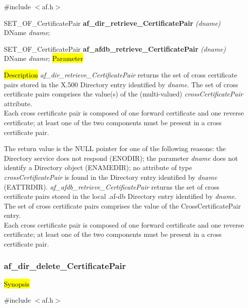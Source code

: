 \#include $<$af.h$>$ 

SET\_OF\_CertificatePair {\bf *af\_dir\_retrieve\_CertificatePair} {\em (dname)} \\
DName {\em *dname};

SET\_OF\_CertificatePair {\bf *af\_afdb\_retrieve\_CertificatePair} {\em (dname)} \\
DName {\em *dname};
\hl{Parameter}

\hl{Description}
{\em af\_dir\_retrieve\_CertificatePair} returns the set of cross certificate pairs 
stored in the X.500 Directory entry identified by {\em dname}. The set of cross certificate pairs 
comprises the value(s) of the (multi-valued) {\em crossCertificatePair} attribute. \\
Each cross certificate pair is composed of one forward certificate and one reverse certificate;
at least one of the two components must be present in a cross certificate pair.

The return value is the NULL pointer for one of the following reasons:
\bi
\m the Directory service does not respond (ENODIR);
\m the parameter {\em dname} does not identify a Directory object (ENAMEDIR);
\m no attribute of type {\em crossCertificatePair} is found in the Directory entry
identified by {\em dname} (EATTRDIR).
\ei
{\em af\_afdb\_retrieve\_CertificatePair} returns the set of cross certificate pairs 
stored in the local .af-db Directory entry identified by {\em dname}. 
The set of cross certificate pairs 
comprises the value of the CrossCertificatePair entry. \\
Each cross certificate pair is composed of one forward certificate and one reverse certificate;
at least one of the two components must be present in a cross certificate pair.



\subsubsection{af\_dir\_delete\_CertificatePair}

\hl{Synopsis}

\#include $<$af.h$>$

